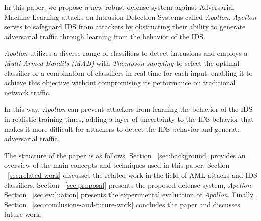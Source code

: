 In this paper, we propose a new robust defense system against Adversarial Machine Learning attacks on Intrusion
Detection Systems called \textit{Apollon}.
\textit{Apollon} serves to safeguard IDS from attackers by obstructing their ability to generate adversarial traffic through
learning from the behavior of the IDS.

\textit{Apollon} utilizes a diverse range of classifiers to detect intrusions and employs a \textit{Multi-Armed Bandits (MAB)}
with \textit{Thompson sampling} to select the optimal classifier or a combination of classifiers in real-time for each input,
enabling it to achieve this objective without compromising its performance on traditional network traffic.

In this way, \textit{Apollon} can prevent attackers from learning the behavior of the IDS in realistic training times, adding a
layer of uncertainty to the IDS behavior that makes it more difficult for attackers to detect the IDS behavior and
generate adversarial traffic.

The structure of the paper is as follows.
Section ~\ref{sec:background} provides an overview of the main concepts and techniques used in this paper.
Section ~\ref{sec:related-work} discusses the related work in the field of AML attacks and IDS classifiers.
Section ~\ref{sec:proposal} presents the proposed defense system, \textit{Apollon}.
Section ~\ref{sec:evaluation} presents the experimental evaluation of \textit{Apollon}.
Finally, Section ~\ref{sec:conclusions-and-future-work} concludes the paper and discusses future work.